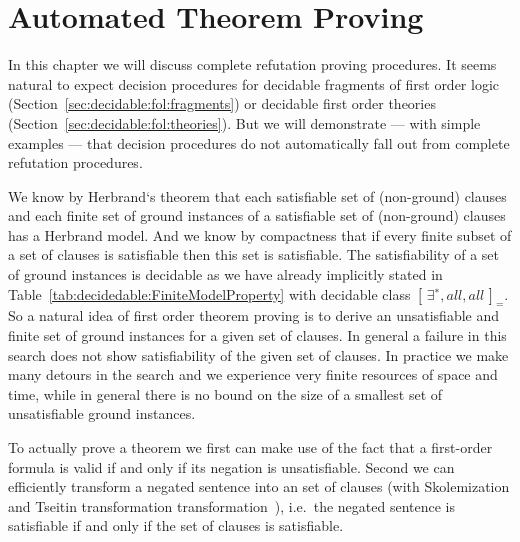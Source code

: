
\chapter{Automated Theorem Proving}\label{chapter:automation}



In this chapter we will discuss complete refutation proving procedures.
It seems natural to expect decision procedures
for decidable fragments of first order logic
(Section~\ref{sec:decidable:fol:fragments})
or decidable first order theories (Section~\ref{sec:decidable:fol:theories}).
But we will demonstrate --- with simple examples ---
that decision procedures do not automatically
fall out from complete refutation procedures.


%
We know by Herbrand`s theorem
that each satisfiable set of (non-ground) clauses
and each finite set of ground instances of a satisfiable set of (non-ground) clauses
has a Herbrand model.
And we know by compactness
that if every finite subset of a set of clauses is satisfiable then this set is satisfiable.
The satisfiability of a set of ground instances is decidable
as we have already implicitly stated in Table~\vref{tab:decidedable:FiniteModelProperty}
with decidable class \( {[ \, \exists^{∗}, all, all \, ]}_{=} \).
So a natural idea of first order theorem proving
is to derive an unsatisfiable and finite set of ground instances for a given set of clauses.
In general a failure in this search does not show satisfiability of the given set of clauses.
In practice we make many detours in the search and we experience very finite resources of space and time,
while in general there is no bound on the size of a smallest set of unsatisfiable ground instances.



To actually prove a theorem
we first can make use of the fact that a first-order formula is valid if and only if its negation is unsatisfiable.
Second we can efficiently transform a negated sentence into an
 set of clauses
(with Skolemization and Tseitin transformation transformation~\cite{tseitin70}),
i.e.~the negated sentence is satisfiable if and only if the set of clauses is satisfiable.

